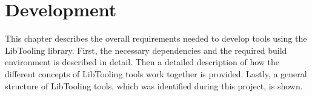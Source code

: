 \chapter{Development}

This chapter describes the overall requirements needed to develop tools using the LibTooling library.
First, the necessary dependencies and the required build environment is described in detail. 
Then a detailed description of how the different concepts of LibTooling tools work together is provided.
Lastly, a general structure of LibTooling tools, which was identified during this project, is shown. 
